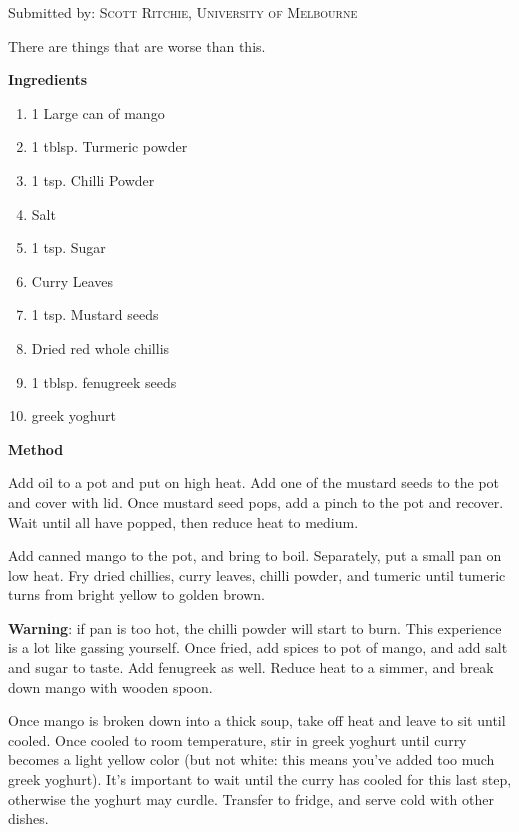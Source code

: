 

Submitted by: \textsc{Scott Ritchie, University of Melbourne}


\begin{shadequote*}
There are things that are worse than this.
\end{shadequote*}
\hrulefill

\textbf{Ingredients}

\begin{enumerate}[before=\itshape,font=\normalfont]
\item 1 Large can of mango
\item 1 tblsp. Turmeric powder
\item 1 tsp. Chilli Powder
\item Salt
\item 1 tsp. Sugar
\item Curry Leaves
\item 1 tsp. Mustard seeds
\item Dried red whole chillis
\item 1 tblsp. fenugreek seeds
\item greek yoghurt
\end{enumerate}

\hrulefill

\textbf{Method}

Add oil to a pot and put on high heat. Add one of the mustard seeds to
the pot and cover with lid. Once mustard seed pops, add a pinch to the
pot and recover. Wait until all have popped, then reduce heat to
medium.

Add canned mango to the pot, and bring to boil. Separately, put a small
pan on low heat. Fry dried chillies, curry leaves, chilli powder, and
tumeric until tumeric turns from bright yellow to golden brown.

\textbf{Warning}: if pan is too hot, the chilli powder will start to burn.
This experience is a lot like gassing yourself. Once fried, add spices
to pot of mango, and add salt and sugar to taste. Add fenugreek as
well. Reduce heat to a simmer, and break down mango with wooden spoon.

Once mango is broken down into a thick soup, take off heat and leave to
sit until cooled. Once cooled to room temperature, stir in greek
yoghurt until curry becomes a light yellow color (but not white: this
means you've added too much greek yoghurt). It's important to wait
until the curry has cooled for this last step, otherwise the yoghurt
may curdle. Transfer to fridge, and serve cold with other dishes.


\vfill
\pagebreak


